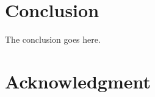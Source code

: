 \documentclass[conference]{../sty/IEEEtran}
\begin{document}
%






\section{Conclusion}
The conclusion goes here.






\section*{Acknowledgment}
\end{document}
